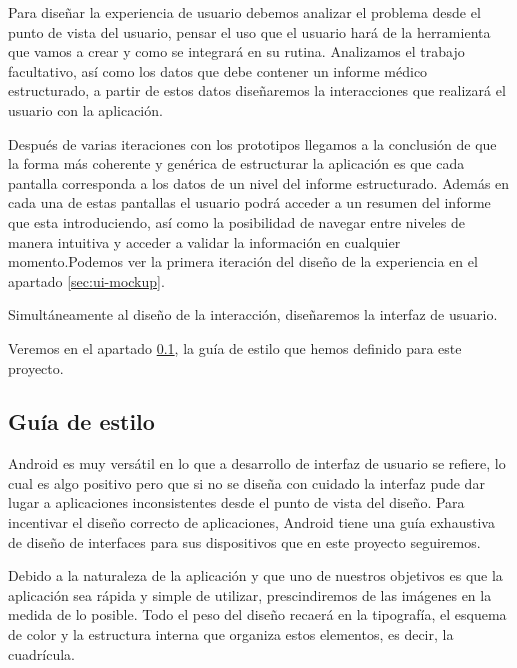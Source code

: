 Para diseñar la experiencia de usuario debemos analizar el problema desde el punto de vista del usuario, pensar el uso que el usuario hará de la herramienta que vamos a crear y como se integrará en su rutina. Analizamos el trabajo facultativo, así como los datos que debe contener un informe médico estructurado, a partir de estos datos diseñaremos la interacciones que realizará el usuario con la aplicación.\par
Después de varias iteraciones con los prototipos llegamos a la conclusión de que la forma más coherente y genérica de estructurar la aplicación es que cada pantalla corresponda a los datos de un nivel del informe estructurado. Además en cada una de estas pantallas el usuario podrá acceder a un resumen del informe que esta introduciendo, así como la posibilidad de navegar entre niveles de manera intuitiva y acceder a validar la información en cualquier momento.Podemos ver la primera iteración del diseño de la experiencia en el apartado \ref{sec:ui-mockup}.\medskip\par

Simultáneamente al diseño de la interacción, diseñaremos la interfaz de usuario.\par
Veremos en el apartado \ref{sec:estilo}, la guía de estilo que hemos definido para este proyecto.\par

\subsection{Guía de estilo}\label{sec:estilo}

Android es muy versátil en lo que a desarrollo de interfaz de usuario se refiere, lo cual es algo positivo pero que si no se diseña con cuidado la interfaz pude dar lugar a aplicaciones inconsistentes desde el punto de vista del diseño. Para incentivar el diseño correcto de aplicaciones, Android tiene una guía exhaustiva de diseño de interfaces para sus dispositivos \cite{android:design} que en este proyecto seguiremos. \par

Debido a la naturaleza de la aplicación y que uno de nuestros objetivos es que la aplicación sea rápida y simple de utilizar, prescindiremos de las imágenes en la medida de lo posible. Todo el peso del diseño recaerá en la tipografía, el esquema de color y la estructura interna que organiza estos elementos, es decir, la cuadrícula.\par
